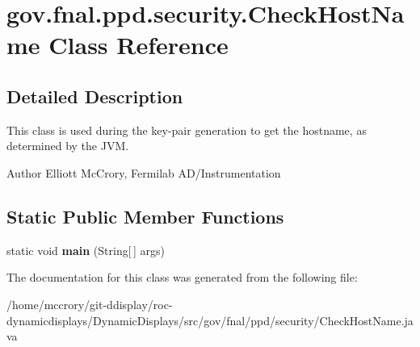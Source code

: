 \hypertarget{classgov_1_1fnal_1_1ppd_1_1security_1_1CheckHostName}{\section{gov.\-fnal.\-ppd.\-security.\-Check\-Host\-Name Class Reference}
\label{classgov_1_1fnal_1_1ppd_1_1security_1_1CheckHostName}
}


\subsection{Detailed Description}
This class is used during the key-\/pair generation to get the hostname, as determined by the J\-V\-M.

\begin{DoxyAuthor}{Author}
Elliott Mc\-Crory, Fermilab A\-D/\-Instrumentation 
\end{DoxyAuthor}
\subsection*{Static Public Member Functions}
\begin{DoxyCompactItemize}
\item 
\hypertarget{classgov_1_1fnal_1_1ppd_1_1security_1_1CheckHostName_aaa7b16bd1e9939eb39940f2c5ea0883a}{static void {\bfseries main} (String\mbox{[}$\,$\mbox{]} args)}\label{classgov_1_1fnal_1_1ppd_1_1security_1_1CheckHostName_aaa7b16bd1e9939eb39940f2c5ea0883a}

\end{DoxyCompactItemize}


The documentation for this class was generated from the following file\-:\begin{DoxyCompactItemize}
\item 
/home/mccrory/git-\/ddisplay/roc-\/dynamicdisplays/\-Dynamic\-Displays/src/gov/fnal/ppd/security/Check\-Host\-Name.\-java\end{DoxyCompactItemize}
